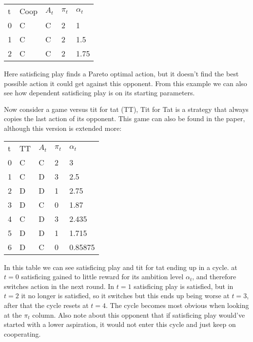 \begin{tabular}{lllll}
  t & Coop & $A_t$ & $\pi_t$ & $\alpha_t$ \\
  0 & C     & C    & 2       & 1 \\
  1 & C     & C    & 2       & 1.5 \\
  2 & C     & C    & 2       & 1.75 \\
\end{tabular}

\cleared Here satisficing play finds a Pareto optimal action, but it doesn't find
the best possible action it could get against this opponent. From this example
we can also see how dependent satisficing play is on its starting parameters.

\cleared Now consider a game versus tit for tat (TT), Tit for Tat is a
strategy that always copies the last action of its opponent.
This game can also be found in the \citep{stimpson:2001} paper, although
this version is extended more:

\begin{tabular}{lllll}
        t & TT & $A_t$ & $\pi_t$ & $\alpha_t$ \\
        0 & C     & C    & 2       & 3  \\
        1 & C     & D    & 3       & 2.5 \\
        2 & D     & D    & 1       & 2.75 \\
        3 & D     & C    & 0       & 1.87 \\
        4 & C     & D    & 3       & 2.435 \\
        5 & D     & D    & 1       & 1.715 \\
        6 & D     & C    & 0       & 0.85875 \\
\end{tabular}

\cleared In this table we can see satisficing play and tit for tat ending up in a cycle.
at $t=0$ satisficing gained to little reward for its ambition level $\alpha_t$,
and therefore switches action in the next round. In $t=1$ satisficing play
is satisfied, but in $t=2$ it no longer is satisfied, so it switches but this ends
up being worse at $t=3$, after that the cycle resets at $t=4$. The cycle becomes
most obvious when looking at the $\pi_t$ column. Also note about this opponent
that if satisficing play would've started with a lower aspiration, it would
not enter this cycle and just keep on cooperating.

